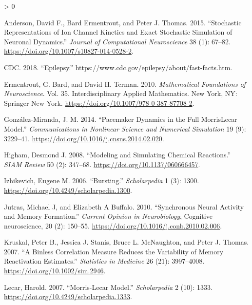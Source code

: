 \documentclass[
]{article}
\newlength{\cslhangindent}
\newenvironment{CSLReferences}[2] %
 {%
  \setlength{\parindent}{0pt}
  \ifodd #1 \everypar{\setlength{\hangindent}{\cslhangindent}}\ignorespaces\fi
  \ifnum #2 > 0
  \setlength{\parskip}{#2\baselineskip}
  \fi
 }%
 {}
\begin{document}
\hypertarget{refs}{}
\begin{CSLReferences}{1}{0}
\leavevmode\hypertarget{ref-anderson15stochastic}{}%
Anderson, David F., Bard Ermentrout, and Peter J. Thomas. 2015. {``Stochastic Representations of Ion Channel Kinetics and Exact Stochastic Simulation of Neuronal Dynamics.''} \emph{Journal of Computational Neuroscience} 38 (1): 67--82. \url{https://doi.org/10.1007/s10827-014-0528-2}.

\leavevmode\hypertarget{ref-cdc18epilepsy}{}%
CDC. 2018. {``Epilepsy.''} https://www.cdc.gov/epilepsy/about/fast-facts.htm.

\leavevmode\hypertarget{ref-ermentrout10mathematical}{}%
Ermentrout, G. Bard, and David H. Terman. 2010. \emph{Mathematical {Foundations} of {Neuroscience}}. Vol. 35. Interdisciplinary {Applied Mathematics}. {New York, NY}: {Springer New York}. \url{https://doi.org/10.1007/978-0-387-87708-2}.

\leavevmode\hypertarget{ref-gonzalez-miranda14pacemaker}{}%
González-Miranda, J. M. 2014. {``Pacemaker Dynamics in the Full {Morris}{{Lecar}} Model.''} \emph{Communications in Nonlinear Science and Numerical Simulation} 19 (9): 3229--41. \url{https://doi.org/10.1016/j.cnsns.2014.02.020}.

\leavevmode\hypertarget{ref-higham08modeling}{}%
Higham, Desmond J. 2008. {``Modeling and {Simulating Chemical Reactions}.''} \emph{SIAM Review} 50 (2): 347--68. \url{https://doi.org/10.1137/060666457}.

\leavevmode\hypertarget{ref-izhikevich06bursting}{}%
Izhikevich, Eugene M. 2006. {``Bursting.''} \emph{Scholarpedia} 1 (3): 1300. \url{https://doi.org/10.4249/scholarpedia.1300}.

\leavevmode\hypertarget{ref-jutras10synchronous}{}%
Jutras, Michael J, and Elizabeth A Buffalo. 2010. {``Synchronous Neural Activity and Memory Formation.''} \emph{Current Opinion in Neurobiology}, Cognitive neuroscience, 20 (2): 150--55. \url{https://doi.org/10.1016/j.conb.2010.02.006}.

\leavevmode\hypertarget{ref-kruskal07binless}{}%
Kruskal, Peter B., Jessica J. Stanis, Bruce L. McNaughton, and Peter J. Thomas. 2007. {``A Binless Correlation Measure Reduces the Variability of Memory Reactivation Estimates.''} \emph{Statistics in Medicine} 26 (21): 3997--4008. \url{https://doi.org/10.1002/sim.2946}.

\leavevmode\hypertarget{ref-lecar07morrislecar}{}%
Lecar, Harold. 2007. {``Morris-{Lecar} Model.''} \emph{Scholarpedia} 2 (10): 1333. \url{https://doi.org/10.4249/scholarpedia.1333}.


\end{CSLReferences}
\end{document}

